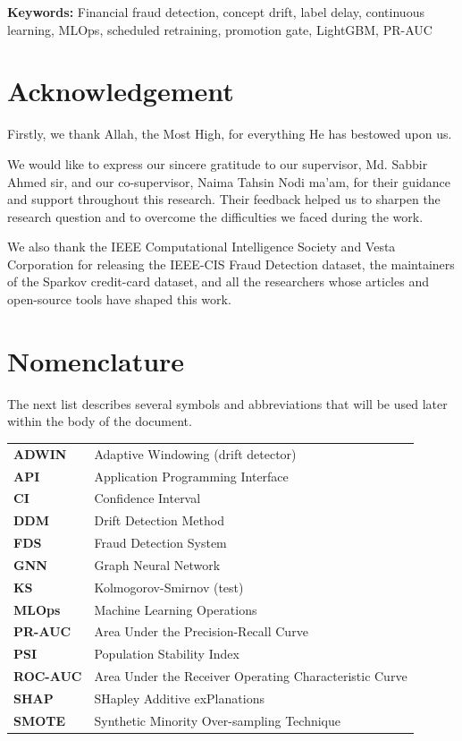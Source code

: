 \documentclass[12pt,a4paper]{report}
\begin{document}
\noindent\textbf{Keywords:} Financial fraud detection, concept drift, label delay, continuous learning, MLOps, scheduled retraining, promotion gate, LightGBM, PR-AUC

\chapter*{Acknowledgement}
Firstly, we thank Allah, the Most High, for everything He has bestowed upon us.

We would like to express our sincere gratitude to our supervisor, Md. Sabbir Ahmed sir, and our co-supervisor, Naima Tahsin Nodi ma'am, for their guidance and support throughout this research. Their feedback helped us to sharpen the research question and to overcome the difficulties we faced during the work.

We also thank the IEEE Computational Intelligence Society and Vesta Corporation for releasing the IEEE-CIS Fraud Detection dataset, the maintainers of the Sparkov credit-card dataset, and all the researchers whose articles and open-source tools have shaped this work.

\tableofcontents
\listoffigures{}
\listoftables{}
\chapter*{Nomenclature}
The next list describes several symbols and abbreviations that will be used later within the body of the document.\par\vspace{0.5em}
\noindent\begin{tabular}{@{}p{}p{}@{}}
\textbf{ADWIN} & Adaptive Windowing (drift detector) \\
\textbf{API} & Application Programming Interface \\
\textbf{CI} & Confidence Interval \\
\textbf{DDM} & Drift Detection Method \\
\textbf{FDS} & Fraud Detection System \\
\textbf{GNN} & Graph Neural Network \\
\textbf{KS} & Kolmogorov-Smirnov (test) \\
\textbf{MLOps} & Machine Learning Operations \\
\textbf{PR-AUC} & Area Under the Precision-Recall Curve \\
\textbf{PSI} & Population Stability Index \\
\textbf{ROC-AUC} & Area Under the Receiver Operating Characteristic Curve \\
\textbf{SHAP} & SHapley Additive exPlanations \\
\textbf{SMOTE} & Synthetic Minority Over-sampling Technique \\
\end{tabular}

\clearpage
{}







\clearpage
{}

\end{document}
